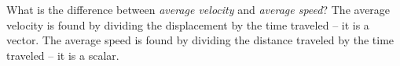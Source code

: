 {What is the difference between \textit{average velocity} and \textit{average speed}?
}
{
The average velocity is found by dividing the displacement by the time traveled -- it is a vector. The average speed is found by dividing the distance traveled by the time traveled -- it is a scalar. 
}

